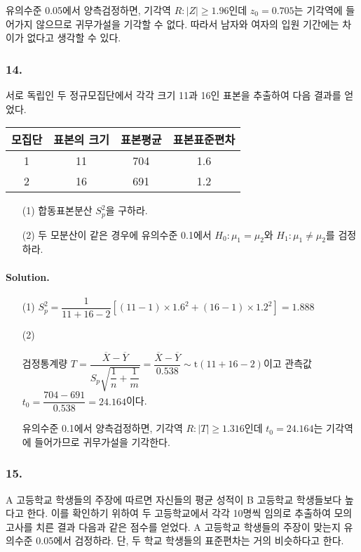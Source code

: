 유의수준 0.05에서 양측검정하면, 기각역 $R:\left|Z\right|\geq 1.96$인데
$z_0=0.705$는 기각역에 들어가지 않으므로 귀무가설을 기각할 수 없다. 따라서 남자와 여자의 입원 기간에는 차이가 없다고 생각할 수 있다.

\subsubsection{14.} 서로 독립인 두 정규모집단에서 각각 크기 11과 16인 표본을 추출하여 다음 결과를 얻었다.

\begin{center}
    \begin{tabular}{c|ccc}
        \hline
        모집단 & 표본의 크기 & 표본평균 & 표본표준편차 \\
        \hline
        1 & 11 & 704 & 1.6 \\ 
        2 & 16 & 691 & 1.2 \\
        \hline
    \end{tabular}
\end{center}

\begin{itemize}
    \item[(1)] 합동표본분산 $S_p^2$을 구하라.
    \item[(2)] 두 모분산이 같은 경우에 유의수준 0.1에서 $H_0:\mu_1=\mu_2$와 $H_1:\mu_1\neq\mu_2$를 검정하라. 
\end{itemize}

\paragraph{Solution.}
\begin{itemize}
    \item[(1)] {
        $S_p^2=\dfrac{1}{11+16-2}\left[\left(11-1\right)\times1.6^2+\left(16-1\right)\times1.2^2\right]=1.888$
    }
    \item[(2)] {
        검정통계량 $T=\dfrac{\overline{X}-\overline{Y}}{S_p\sqrt{\dfrac{1}{n}+\dfrac{1}{m}}}
        =\dfrac{\overline{X}-\overline{Y}}{0.538} \sim \mathrm{t}\left(11+16-2\right)$이고 관측값 $t_0=\dfrac{704-691}{0.538}=24.164$이다.

        유의수준 0.1에서 양측검정하면, 기각역 $R:\left|T\right|\geq 1.316$인데
        $t_0=24.164$는 기각역에 들어가므로 귀무가설을 기각한다.
    }
\end{itemize}

\subsubsection{15.} A 고등학교 학생들의 주장에 따르면 자신들의 평균 성적이 B 고등학교 학생들보다 높다고 한다. 이를 확인하기 위하여 두 고등학교에서
각각 10명씩 임의로 추출하여 모의고사를 치른 결과 다음과 같은 점수를 얻었다. A 고등학교 학생들의 주장이 맞는지 유의수준 0.05에서 검정하라. 단,
두 학교 학생들의 표준편차는 거의 비슷하다고 한다.

